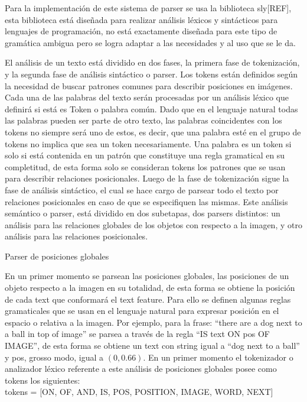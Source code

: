 Para la implementación de este sistema de parser se usa la biblioteca sly[REF], esta biblioteca está diseñada para realizar análisis léxicos y sintácticos para lenguajes de programación, no está exactamente diseñada para este tipo de gramática ambigua pero se logra adaptar a las necesidades y al uso que se le da.

El análisis de un texto está dividido en dos fases, la primera fase de tokenización, y la segunda fase de análisis sintáctico o parser. Los tokens están definidos según la necesidad de buscar patrones comunes para describir posiciones en imágenes. Cada una de las palabras del texto serán procesadas por un análisis léxico que definirá si está es Token o palabra común. Dado que en el lenguaje natural todas las palabras pueden ser parte de otro texto, las palabras coincidentes con los tokens no siempre será uno de estos, es decir, que una palabra esté en el grupo de tokens no implica que sea un token necesariamente. Una palabra es un token si solo si está contenida en un patrón que constituye una regla gramatical en su completitud, de esta forma solo se consideran tokens los patrones que se usan para describir relaciones posicionales. Luego de la fase de tokenización sigue la fase de análisis sintáctico, el cual se hace cargo de parsear todo el texto por relaciones posicionales en caso de que se especifiquen las mismas. Este análisis semántico o parser, está dividido en dos subetapas, dos parsers distintos: un análisis para las relaciones globales de los objetos con respecto a la imagen, y otro análisis para las relaciones posicionales.

\subsubsubsection*Parser de posiciones globales

En un primer momento se parsean las posiciones globales, las posiciones de un objeto respecto a la imagen en su totalidad, de esta forma se obtiene la posición de cada text que conformará el text feature. Para ello se definen algunas reglas gramaticales que se usan en el lenguaje natural para expresar posición en el espacio o relativa a la imagen. Por ejemplo, para la frase: “there are a dog next to a ball in top of image” se parsea a través de la regla “IS text ON pos OF IMAGE”, de esta forma se obtiene un text con string igual a “dog next to a ball” y pos, grosso modo, igual a $(0, 0.66)$. En un primer momento el tokenizador o analizador léxico referente a este análisis de posiciones globales posee como tokens los siguientes:\\

tokens = [ON, OF, AND, IS, POS, POSITION, IMAGE, WORD, NEXT]\\

